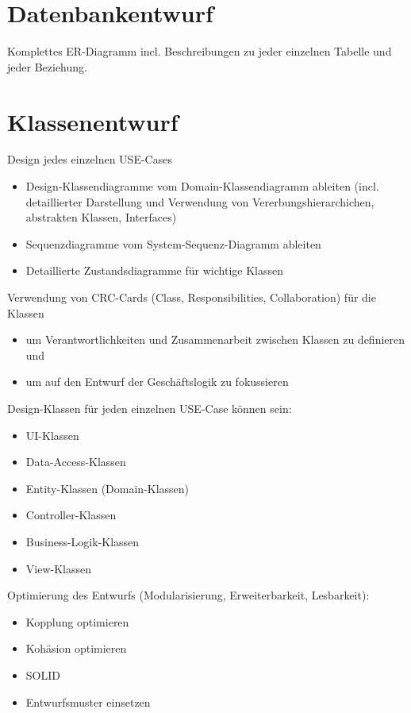 \section{Datenbankentwurf}
Komplettes ER-Diagramm incl. Beschreibungen zu jeder einzelnen Tabelle und jeder Beziehung.

\section{Klassenentwurf}
Design jedes einzelnen USE-Cases

\begin{itemize}
	\item Design-Klassendiagramme vom Domain-Klassendiagramm ableiten (incl. detaillierter Darstellung und Verwendung von Vererbungshierarchichen, abstrakten Klassen, Interfaces)
	\item Sequenzdiagramme vom System-Sequenz-Diagramm ableiten
	\item 	Detaillierte Zustandsdiagramme für wichtige Klassen
\end{itemize}

Verwendung von CRC-Cards (Class, Responsibilities, Collaboration) für die Klassen
\begin{itemize}
	\item um Verantwortlichkeiten und Zusammenarbeit zwischen Klassen zu definieren und
	\item um auf den Entwurf der Geschäftslogik zu fokussieren
\end{itemize}

Design-Klassen für jeden einzelnen USE-Case können sein:
\begin{itemize}
	\item UI-Klassen
	\item Data-Access-Klassen
	\item Entity-Klassen (Domain-Klassen)
	\item Controller-Klassen
	\item Business-Logik-Klassen
	\item View-Klassen
\end{itemize}

Optimierung des Entwurfs (Modularisierung, Erweiterbarkeit, Lesbarkeit):
\begin{itemize}
	\item Kopplung optimieren
	\item 	Kohäsion optimieren
	\item 	SOLID
	\item 	Entwurfsmuster einsetzen
\end{itemize}

